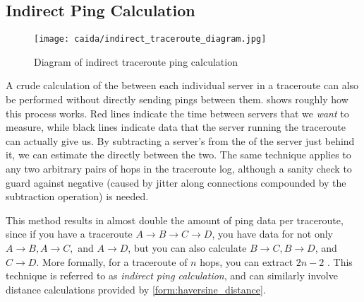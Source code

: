 \subsection{Indirect Ping Calculation}

\begin{figure}[h]
    \centering
    \texttt{[image: caida/indirect\_traceroute\_diagram.jpg]}
    \caption{Diagram of indirect traceroute ping calculation}
    \label{fig:indirect_ping_diagram}
\end{figure}

A crude calculation of the \rtt between each individual server in a traceroute can also be performed without directly sending pings between them.  shows roughly how this process works. Red lines indicate the time between servers that we \textit{want} to measure, while black lines indicate data that the server running the traceroute can actually give us. By subtracting a server's \rtt from the \rtt of the server just behind it, we can estimate the \rtt directly between the two. The same technique applies to any two arbitrary pairs of hops in the traceroute log, although a sanity check to guard against negative \rtts (caused by jitter along connections compounded by the subtraction operation) is needed.

This method results in almost double the amount of ping data per traceroute, since if you have a traceroute $A\rightarrow B\rightarrow C\rightarrow D$, you have data for not only $A\rightarrow B, A\rightarrow C,$ and $A\rightarrow D$, but you can also calculate $B\rightarrow C, B\rightarrow D$, and $C\rightarrow D$. More formally, for a traceroute of $n$ hops, you can extract $2n-2$ \rtts. This technique is referred to as \textit{indirect ping calculation}, and can similarly involve distance calculations provided by \cref{form:haversine_distance}.

